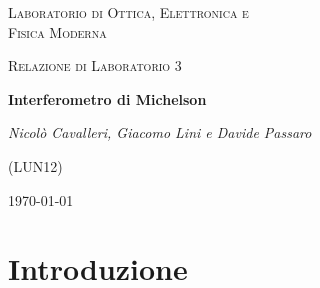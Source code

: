 \documentclass[a4paper,11pt]{article}
\begin{document}
\begin{titlepage}
	\centering
	{\scshape\LARGE Laboratorio di Ottica, Elettronica e \\ Fisica Moderna \par}
	\vspace{1cm}
	{\scshape\Large Relazione di Laboratorio 3\par}
	\vspace{1.5cm}
	{\huge\bfseries Interferometro di Michelson\par}
	\vspace{2cm}

	{\Large\itshape Nicolò Cavalleri, Giacomo Lini e Davide Passaro
		
	(LUN12)}

	\vspace{5cm}
	\vfill

	\begin{abstract}
	Di seguito vengono riportate la procedura sperimentale, e l'analisi dei dati raccolti relaivi a un esperimento compiuto con un Interferometro di Michelson. In particolare tramite il calcolo delle frange di interferenza dell'immagine prodotta viene determinata la lunghezza d'onda della luce emessa da un laser monocromatico. Altre grandezze fisiche rilevanti che questo apparato consente di mettere in evidenza sono l'indice di rifrazione dell'aria, la lunghezza dei pacchetti d'onda emessi da luce non moncromatica, e la differenza di lunghezza d'onda tra sorgenti differenti, nello specifico l'analisi è relativa al doppietto di sodio. Per ugnuna di queste grandezze vengono riportate procedure sperimentali e risultati comprensivi di errore.
	\end{abstract}


	\vfill
	{\large \today\par}

\end{titlepage}

\newpage

\section{Introduzione}
\end{document}
